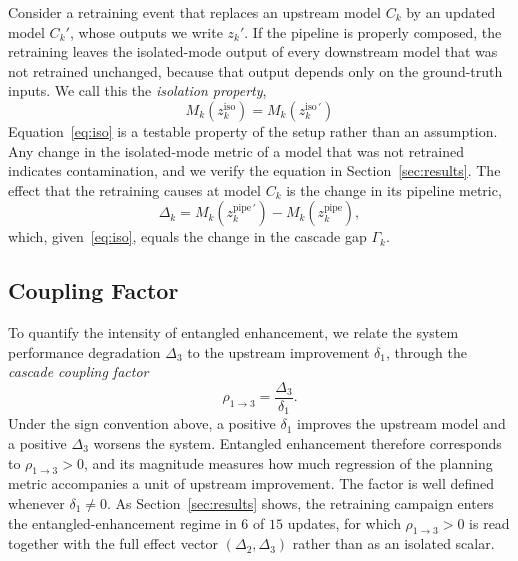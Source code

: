 \documentclass[conference]{IEEEtran}
\begin{document}
Consider a retraining event that replaces an upstream model $C_k$ by an updated
model $C_k'$, whose outputs we write $z_k'$. If the pipeline is properly composed,
the retraining leaves the isolated-mode output of every downstream model that was
not retrained unchanged, because that output depends only on the ground-truth
inputs. We call
this the \emph{isolation property},
\begin{equation}
M_k(z_k^{\text{iso}}) = M_k(z_k^{\text{iso}\,\prime})
\label{eq:iso}
\end{equation}
Equation~\eqref{eq:iso} is a testable property of the setup rather than an
assumption. Any change in the isolated-mode metric of a model that was not retrained indicates
contamination, and we verify the equation in Section~\ref{sec:results}. The effect
that the retraining causes at model $C_k$ is the change in its pipeline
metric,
\begin{equation}
\Delta_k = M_k(z_k^{\text{pipe}\,\prime}) - M_k(z_k^{\text{pipe}}),
\label{eq:inj}
\end{equation}
which, given~\eqref{eq:iso}, equals the change in the cascade gap $\Gamma_k$.

\subsection{Coupling Factor}
\label{sec:diag}
To quantify the intensity of entangled enhancement, we relate the system performance degradation $\Delta_3$ to the upstream
improvement $\delta_1$, through the \emph{cascade coupling
factor}
\begin{equation}
\rho_{1\to 3} = \frac{\Delta_3}{\delta_1}.
\label{eq:rho-def}
\end{equation}
Under the sign convention above, a positive $\delta_1$ improves the upstream model
and a positive $\Delta_3$ worsens the system. Entangled enhancement therefore
corresponds to $\rho_{1\to 3} > 0$, and its magnitude measures how much regression
of the planning metric accompanies a unit of upstream improvement. The factor is well defined whenever
$\delta_1 \neq 0$. As Section~\ref{sec:results} shows, the retraining campaign
enters the entangled-enhancement regime in $6$ of $15$ updates, for which
$\rho_{1\to 3} > 0$ is read together with the full effect vector
$(\Delta_2, \Delta_3)$ rather than as an isolated scalar.

\end{document}
